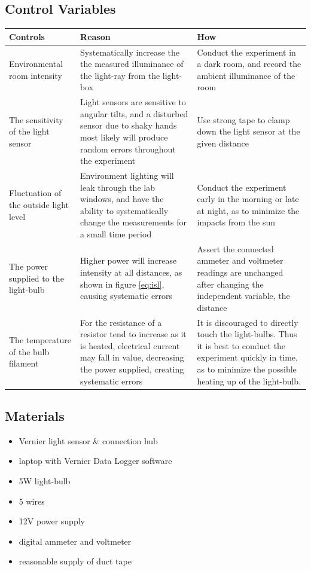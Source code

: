 \documentclass[a4paper,12pt]{article}
\begin{document}
\subsection{Control Variables}

\begin{longtable}{P{0.2\textwidth}|P{0.35\textwidth}|P{0.35\textwidth}}
Controls & Reason & How\\\hline
Environmental room intensity & Systematically increase the the measured illuminance of the light-ray from the light-box & Conduct the experiment in a dark room, and record the ambient illuminance of the room \\
The sensitivity of the light sensor & Light sensors are sensitive to angular tilts, and a disturbed sensor due to shaky hands most likely will produce random errors throughout the experiment & Use strong tape to clamp down the light sensor at the given distance\\
Fluctuation of the outside light level & Environment lighting will leak through the lab windows, and have the ability to systematically change the measurements for a small time period & Conduct the experiment early in the morning or late at night, as to minimize the impacts from the sun\\
The power supplied to the light-bulb & Higher power will increase intensity at all distances, as shown in figure \ref{eq:isl}, causing systematic errors & Assert the connected ammeter and voltmeter readings are unchanged after changing the independent variable, the distance\\
The temperature of the bulb filament & For the resistance of a resistor tend to increase as it is heated, electrical current may fall in value, decreasing the power supplied, creating systematic errors & It is discouraged to directly touch the light-bulbs. Thus it is best to conduct the experiment quickly in time, as to minimize the possible heating up of the light-bulb.

\end{longtable}


\subsection{Materials}
\begin{itemize}
 \item Vernier light sensor \& connection hub
 \item laptop with Vernier Data Logger software
 \item 5W light-bulb
 \item 5 wires
 \item 12V power supply
 \item digital ammeter and voltmeter
 \item reasonable supply of duct tape
 \end{itemize}
\end{document}
